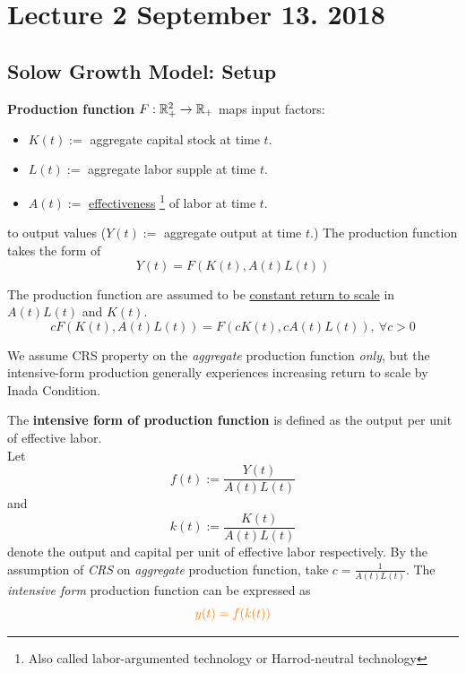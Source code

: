 \documentclass[11pt]{article}
\begin{document}
	\section{Lecture 2 September 13. 2018}
		\subsection{Solow Growth Model: Setup}
			\begin{definition}
				\textbf{Production function} $F: \mathbb{R}^2_{+} \rightarrow \mathbb{R}_+$ maps input factors:
				\begin{itemize}
					\item $K(t) := $ aggregate capital stock at time $t$.
					\item $L(t) := $ aggregate labor supple at time $t$.
					\item $A(t) := $ \ul{effectiveness} \footnote{Also called labor-argumented technology or Harrod-neutral technology} of labor at time $t$.
				\end{itemize} 
				to output values ($Y(t) := $ aggregate output at time $t$.) The production function takes the form of
				\begin{equation}
					Y(t) = F(K(t), A(t)L(t))
				\end{equation}
			\end{definition}
			
			\begin{assumption}
				The production function are assumed to be \ul{constant return to scale} in $A(t)L(t)$ and $K(t)$.
				\begin{equation}
					cF(K(t), A(t)L(t)) = F(cK(t), cA(t)L(t)),\ \forall c > 0
				\end{equation}
			\end{assumption}
			
			\begin{remark}
				We assume CRS property on the \emph{aggregate} production function \emph{only}, but the intensive-form production generally experiences increasing return to scale by Inada Condition.
			\end{remark}
			
			\begin{definition}
				The \textbf{intensive form of production function} is defined as the output per unit of effective labor. \\
				Let 
				\begin{equation}
					f(t) := \frac{Y(t)}{A(t)L(t)}
				\end{equation}
				and 
				\begin{equation}
					k(t) := \frac{K(t)}{A(t)L(t)}
				\end{equation}
				denote the output and capital per unit of effective labor respectively. By the assumption of \emph{CRS} on \emph{aggregate} production function, take $c = \frac{1}{A(t)L(t)}$. The \emph{intensive form} production function can be expressed as
				\begin{equation}
					\textcolor{orange}{
						y(t) = f(k(t))
					}
				\end{equation}
			\end{definition}
			
\end{document}
